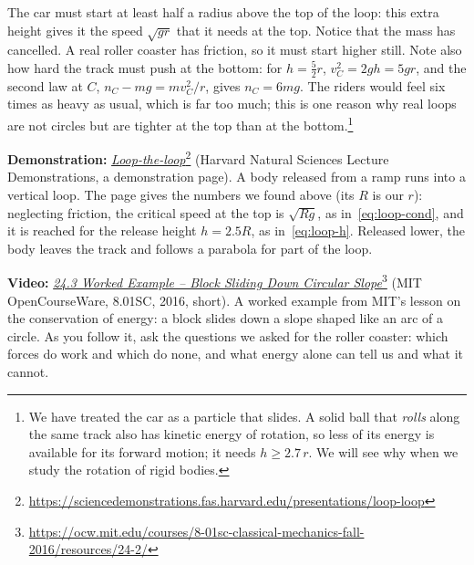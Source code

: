 \documentclass[11pt,a4paper]{article}
\begin{document}
The car must start at least half a radius above the top of the loop: this extra height gives it the
speed $\sqrt{gr}$ that it needs at the top. Notice that the mass has cancelled. A real roller
coaster has friction, so it must start higher still. Note also how hard the track must push at the
bottom: for $h = \frac52 r$, $v_C^2 = 2gh = 5gr$, and the second law at $C$,
$n_C - mg = mv_C^2/r$, gives $n_C = 6mg$. The riders would feel six times as heavy as usual, which
is far too much; this is one reason why real loops are not circles but are tighter at the top
than at the bottom.\footnote{We have treated the car as a particle that slides. A solid ball
that \emph{rolls} along the same track also has kinetic energy of rotation, so less of its energy
is available for its forward motion; it needs $h \geq 2.7\,r$. We will see why when we study the
rotation of rigid bodies.}

\begin{aside}
\textbf{Demonstration:}
\href{https://sciencedemonstrations.fas.harvard.edu/presentations/loop-loop}{\emph{Loop-the-loop}}\footnote{\url{https://sciencedemonstrations.fas.harvard.edu/presentations/loop-loop}}
(Harvard Natural Sciences Lecture Demonstrations, a demonstration page). A body released from a
ramp runs into a vertical loop. The page gives the numbers we found above (its $R$ is our $r$):
neglecting friction, the critical speed at the top is $\sqrt{Rg}$, as in~\eqref{eq:loop-cond}, and
it is reached for the release height $h = 2.5R$, as in~\eqref{eq:loop-h}. Released lower, the body
leaves the track and follows a parabola for part of the loop.
\par\smallskip
\textbf{Video:}
\href{https://ocw.mit.edu/courses/8-01sc-classical-mechanics-fall-2016/resources/24-2/}{\emph{24.3
Worked Example -- Block Sliding Down Circular
Slope}}\footnote{\url{https://ocw.mit.edu/courses/8-01sc-classical-mechanics-fall-2016/resources/24-2/}}
(MIT OpenCourseWare, 8.01SC, 2016, short). A worked example from MIT's lesson on the conservation
of energy: a block slides down a slope shaped like an arc of a circle. As you follow it, ask the
questions we asked for the roller coaster: which forces do work and which do none, and what energy
alone can tell us and what it cannot.
\end{aside}
\end{document}
